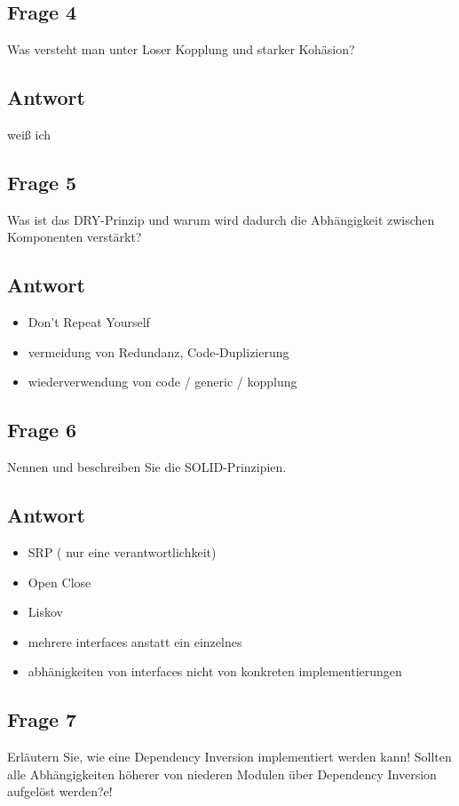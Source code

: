 \subsection*{Frage 4}
Was versteht man unter Loser Kopplung und starker Kohäsion?
\subsection*{Antwort}
weiß ich

\subsection*{Frage 5}
Was ist das DRY-Prinzip und warum wird dadurch die Abhängigkeit zwischen Komponenten verstärkt?
\subsection*{Antwort}
\begin{itemize}
	\item Don't Repeat Yourself
	\item vermeidung von Redundanz, Code-Duplizierung
	\item wiederverwendung von code / generic / kopplung
\end{itemize}

\subsection*{Frage 6}
Nennen und beschreiben Sie die SOLID-Prinzipien.
\subsection*{Antwort}
\begin{itemize}
	\item SRP ( nur eine verantwortlichkeit)
	\item Open Close
	\item Liskov
	\item mehrere interfaces anstatt ein einzelnes
	\item abhänigkeiten von interfaces nicht von konkreten implementierungen
\end{itemize}

\subsection*{Frage 7}
Erläutern Sie, wie eine Dependency Inversion implementiert werden kann! Sollten alle Abhängigkeiten höherer von niederen Modulen über Dependency Inversion aufgelöst werden?e!

